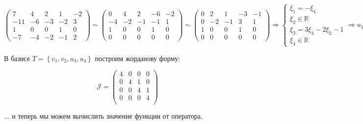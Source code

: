 \documentclass{article}
\begin{document}
$$\left(\begin{array}{cccc|c}
7 & 4 & 2 & 1 & -2\\
-11 & -6 & -3 & -2 & 3 \\
1 & 0 & 0 & 1 & 0\\
-7 & -4 & -2 & -1 & 2
\end{array}\right) \sim \left(\begin{array}{cccc|c}
0 & 4 & 2 & -6 & -2\\
-4 & -2 & -1 & -1 & 1 \\
1 & 0 & 0 & 1 & 0\\
0 & 0 & 0 & 0 & 0
\end{array}\right) \sim \left(\begin{array}{cccc|c}
0 & 2 & 1 & -3 & -1\\
0 & -2 & -1 & 3 & 1 \\
1 & 0 & 0 & 1 & 0\\
0 & 0 & 0 & 0 & 0
\end{array}\right) \Rightarrow \begin{cases}
\xi_1 = -\xi_4 \\
\xi_2 \in \mathbb{R} \\
\xi_3 = 3\xi_4 - 2\xi_2 - 1 \\
\xi_4 \in \mathbb{R}
\end{cases} \Rightarrow u_3 = \begin{pmatrix}
0 \\1  \\ -3 \\ 0
\end{pmatrix}\quad u_4 = \begin{pmatrix}
-1 \\ 0 \\ 2 \\ 1
\end{pmatrix}$$
\begin{center}В базисе $T=\left\{v_1, v_2, u_3, u_4\right\}$ построим жорданову форму:
\end{center}
$$\mathcal{J} = \begin{pmatrix}
4 & 0 & 0 & 0 \\
0 & 4 & 1 & 0 \\
0 & 0 & 4 & 1 \\
0 & 0 & 0 & 4 \\
\end{pmatrix}$$
\begin{center}
... и теперь мы можем вычислить значение функции от оператора.
\end{center}
\end{document}
